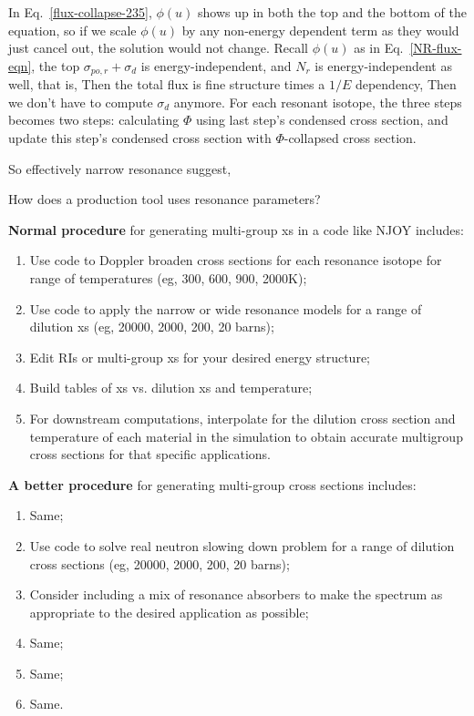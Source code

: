 \documentclass{school-22.211-notes}
\begin{document}
\begin{enumerate}
In Eq.~\ref{flux-collapse-235}, $\phi(u)$ shows up in both the top and the bottom of the equation, so if we scale $\phi(u)$ by any non-energy dependent term as they would just cancel out, the solution would not change. Recall $\phi(u)$ as in Eq.~\ref{NR-flux-eqn}, the top $\sigma_{po,r} + \sigma_d$ is energy-independent, and $N_r$ is energy-independent as well, that is, 
Then the total flux is fine structure times a $1/E$ dependency, 
Then we don't have to compute $\sigma_d$ anymore. For each resonant isotope, the three steps becomes two steps: calculating $\Phi$ using last step's condensed cross section, and update this step's condensed cross section with $\Phi$-collapsed cross section. 

So effectively narrow resonance suggest, 

\end{enumerate}




How does a production tool uses resonance parameters?

\textbf{Normal procedure} for generating multi-group xs in a code like NJOY includes:
\begin{enumerate}
\item Use code to Doppler broaden cross sections for each resonance isotope for range of temperatures (eg, 300, 600, 900, 2000K); 
\item Use code to apply the narrow or wide resonance models for a range of dilution xs (eg, 20000, 2000, 200, 20 barns); 
\item Edit RIs or multi-group xs for your desired energy structure; 
\item Build tables of xs vs. dilution xs and temperature;
\item For downstream computations, interpolate for the dilution cross section and temperature of each material in the simulation to obtain accurate multigroup cross sections for that specific applications. 
\end{enumerate}

\textbf{A better procedure} for generating multi-group cross sections includes:
\begin{enumerate}
\item Same;
\item Use code to solve real neutron slowing down problem for a range of dilution cross sections (eg, 20000, 2000, 200, 20 barns);
\item Consider including a mix of resonance absorbers to make the spectrum as appropriate to the desired application as possible;
\item Same;
\item Same;
\item Same.
\end{enumerate}
\end{document}
